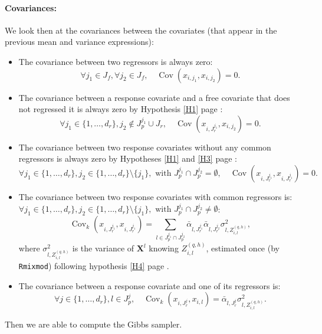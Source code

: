 \documentclass[12pt,a4paper]{report}
\begin{document}
\paragraph{Covariances:} We look then at the covariances between the covariates (that appear in the previous mean and variance expressions):
\begin{itemize}
	\item The covariance between two regressors is always zero:
	\begin{equation}
		\forall j_1 \in J_f, \forall j_2 \in J_f, \quad   \operatorname{Cov}(x_{i,j_1},x_{i,j_2})=0. \nonumber 
	\end{equation}
	\item The covariance between a response covariate and a free covariate that does not regressed it is always zero by Hypothesis \ref{H1} page \pageref{H1}:
	\begin{equation}
		\forall j_1 \in \{1,\dots,d_r \}, j_2 \notin J_p^{j_1}\cup J_r, \quad \operatorname{Cov}(x_{i,J_r^{j_1}},x_{i,j_2})=0. \nonumber 
	\end{equation}
	\item The covariance between two response covariates without any common regressors is always zero  by Hypotheses \ref{H1} and \ref{H3} page \pageref{H3}:
	\begin{equation}
		\forall j_1 \in \{1,\dots,d_r \}, j_2 \in \{1,\dots, d_r \}\setminus\{ j_1 \}, \textrm{ with } J_p^{j_1}\cap J_p^{j_2}= \emptyset, \quad \operatorname{Cov}(x_{i,J_r^{j_1}},x_{i,J_r^{j_1}})=0. \nonumber 
	\end{equation}
	\item The covariance between two response covariates with common regressors is:\\
	$\forall j_1 \in \{1,\dots,d_r \}, j_2 \in \{1,\dots, d_r \}\setminus\{ j_1 \}, \textrm{ with } J_p^{j_1}\cap J_p^{j_2}\neq \emptyset$:
	\begin{equation}
	  \operatorname{Cov}_k(x_{i,J_r^{j_1}},x_{i,J_r^{j_1}})=\sum_{l \in J_p^{j_1}\cap J_p^{j_2}}\bar{\alpha}_{l,J_r^{j_1}}\bar{\alpha}_{l,J_r^{j_2}}\sigma^2_{l,Z_{i,l}^{(q,h)}} , \nonumber 
	\end{equation}
	where $\sigma^2_{l,Z_{i,l}^{(q,h)}}$ is the variance of $\boldsymbol{X}^l$ knowing $Z_{i,l}^{(q,h)}$, estimated once (by {\tt Rmixmod}) following hypothesis \ref{H4} page \pageref{H4}.
	\item The covariance between a response covariate and one of its regressors is:
	\begin{equation}
		\forall j \in \{1,\dots, d_r\}, l \in J_p^{j}, \quad \operatorname{Cov}_k(x_{i,J_r^{j}},x_{i,l})=\bar{\alpha}_{l,J_r^{j}}\sigma^2_{l,Z_{i,l}^{(q,h)}} . \nonumber 
	\end{equation}
\end{itemize}
Then we are able to compute the Gibbs sampler.
\end{document}
